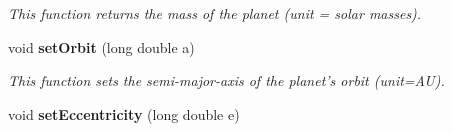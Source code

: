 \begin{CompactItemize}
\begin{CompactList}\small\item\em This function returns the mass of the planet (unit = solar masses). \item\end{CompactList}\item 
void {\bf set\-Orbit} (long double a)\label{class_s_g___planet_a6}

\begin{CompactList}\small\item\em This function sets the semi-major-axis of the planet's orbit (unit=AU). \item\end{CompactList}\item 
void {\bf set\-Eccentricity} (long double e)\label{class_s_g___planet_a7}


\end{CompactItemize}
